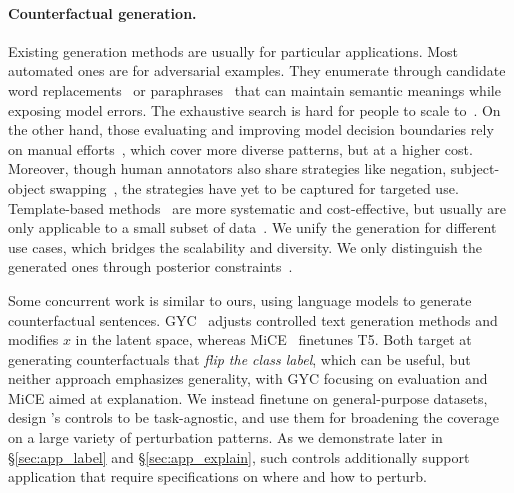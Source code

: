 \paragraph{Counterfactual generation.}
Existing generation methods are usually for particular applications.
Most automated ones are for adversarial examples. 
They enumerate through candidate word replacements~\cite{alzantot2018generating, garg2020bae} or paraphrases~\cite{iyyer2018adversarial, malandrakis-etal-2019-controlled} that can maintain semantic meanings while exposing model errors.
The exhaustive search is hard for people to scale to~\cite{ribeiro2018sear}.
On the other hand, those evaluating and improving model decision boundaries rely on manual efforts~\cite{checklist:acl20}, which cover more diverse patterns, but at a higher cost.
Moreover, though human annotators also share strategies like negation, subject-object swapping~\cite{kaushik2019learning, gardner2020contrast}, the strategies have yet to be captured for targeted use.
Template-based methods~\cite{mccoy2019right, nie2019analyzing} are more systematic and cost-effective, but usually are only applicable to a small subset of data~\cite{li2020linguistically}.
We unify the generation for different use cases, which bridges the scalability and diversity.
We only distinguish the generated ones through posterior constraints~\cite{morris2020textattack, alzantot-etal-2018-generating}.

Some concurrent work is similar to ours, using language models to generate counterfactual sentences. 
GYC~\cite{madaan2020generate} adjusts controlled text generation methods and modifies $x$ in the latent space, whereas MiCE~\cite{ross2020explaining} finetunes T5.
Both target at generating counterfactuals that \emph{flip the class label}, which can be useful, but 
neither approach emphasizes generality, with GYC focusing on evaluation and MiCE aimed at explanation.
We instead finetune \sysname on general-purpose datasets, design \sysname's controls to be task-agnostic, and use them for broadening the coverage on a large variety of perturbation patterns.
As we demonstrate later in \S\ref{sec:app_label} and \S\ref{sec:app_explain}, such controls additionally support application that require specifications on where and how to perturb.





